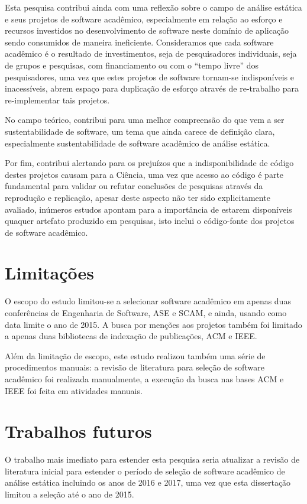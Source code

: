 Esta pesquisa contribui ainda com uma reflexão sobre o campo de análise
estática e seus projetos de software acadêmico, especialmente em relação ao
esforço e recursos investidos no desenvolvimento de software neste domínio de
aplicação sendo consumidos de maneira ineficiente. Consideramos que cada software
acadêmico é o resultado de investimentos, seja de pesquisadores individuais, seja
de grupos e pesquisas, com financiamento ou com o ``tempo livre'' dos pesquisadores,
uma vez que estes projetos de software tornam-se indisponíveis e inacessíveis,
abrem espaço para duplicação de esforço através de re-trabalho para re-implementar
tais projetos.

No campo teórico, contribui para uma melhor compreensão do que vem a ser
sustentabilidade de software, um tema que ainda carece de definição clara,
especialmente sustentabilidade de software acadêmico de análise estática.

Por fim, contribui alertando para os prejuízos que a indisponibilidade de
código destes projetos causam para a Ciência, uma vez que acesso ao código é
parte fundamental para validar ou refutar conclusões de pesquisas através da
reprodução e replicação, apesar deste aspecto não ter sido explicitamente avaliado,
inúmeros estudos apontam para a importância de estarem disponíveis quaquer
artefato produzido em pesquisas, isto inclui o código-fonte dos projetos de
software acadêmico.

\section{Limitações}

O escopo do estudo limitou-se a selecionar software acadêmico em apenas
duas conferências de
Engenharia de Software, ASE e SCAM, e ainda, usando como data limite o ano de
2015. A busca por menções aos projetos também foi limitado a apenas duas
bibliotecas de indexação de publicações, ACM e IEEE.

Além da limitação de escopo, este estudo realizou também uma série de
procedimentos manuais: a revisão de literatura para seleção de software
acadêmico foi realizada manualmente, a execução da busca nas bases ACM e IEEE
foi feita em atividades manuais.

\section{Trabalhos futuros}

O trabalho mais imediato para estender esta pesquisa seria atualizar a revisão
de literatura inicial para estender o período de seleção de software acadêmico
de análise estática incluindo os anos de 2016 e 2017, uma vez que esta
dissertação limitou a seleção até o ano de 2015.

